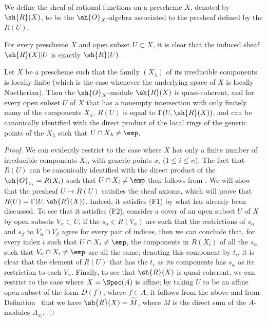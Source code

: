 \begin{definition}[7.3.2]
\label{I.7.3.2}
We define the sheaf of rational functions on a prescheme $X$, denoted by $\sh{R}(X)$, to be the $\sh{O}_X$-algebra associated to the presheaf defined by the $R(U)$.
\end{definition}

For every prescheme $X$ and open subset $U\subset X$, it is clear that the induced sheaf $\sh{R}(X)|U$ is exactly $\sh{R}(U)$.

\begin{proposition}[7.3.3]
\label{I.7.3.3}
Let $X$ be a prescheme such that the family $(X_\lambda)$ of its irreducible components is locally finite (which is the case whenever the underlying space of $X$ is locally Noetherian).
Then the $\sh{O}_X$-module $\sh{R}(X)$ is quasi-coherent, and for every open subset $U$ of $X$ that has a nonempty intersection with only finitely many of the components $X_\lambda$, $R(U)$ is equal to $\Gamma(U,\sh{R}(X))$, and can be canonically identified with the direct product of the local rings of the generic points of the $X_\lambda$ such that $U\cap X_\lambda\neq\emp$.
\end{proposition}

\begin{proof}
We can evidently restrict to the case where $X$ has only a finite number of irreducible components $X_i$, with generic points $x_i$ ($1\leq i\leq n$).
The fact that $R(U)$ can be canonically identified with the direct product of the $\sh{O}_{x_i}=R(X_i)$ such that $U\cap X_i\neq\emp$ then follows from .
We will show that the presheaf $U\to R(U)$ satisfies the sheaf axioms, which will prove that $R(U)=\Gamma(U,\sh{R}(X))$.
Indeed, it satisfies (F1) by what has already been discussed.
To see that it satisfies (F2), consider a cover of an open subset $U$ of $X$ by open subsets $V_\alpha\subset U$; if the $s_\alpha\in R(V_\alpha)$ are such that the restrictions of $s_\alpha$ and $s_\beta$ to $V_\alpha\cap V_\beta$ agree for every pair of indices, then we can conclude that, for every index $i$ such that $U\cap X_i\neq\emp$, the components in $R(X_i)$ of all the $s_\alpha$ such that $V_\alpha\cap X_i\neq\emp$ are all the same; denoting this component by $t_i$, it is clear that the element of $R(U)$ that has the $t_i$ as its components has $s_\alpha$ as its restriction to each $V_\alpha$.
Finally, to see that $\sh{R}(X)$ is quasi-coherent, we can restrict to the case where $X=\Spec(A)$ is affine; by taking $U$ to be an affine open subset of the form $D(f)$, where $f\in A$, it follows from the above and from Definition~ that we have $\sh{R}(X)=\widetilde{M}$, where $M$ is the direct sum of the $A$-modules $A_{x_i}$.
\end{proof}

